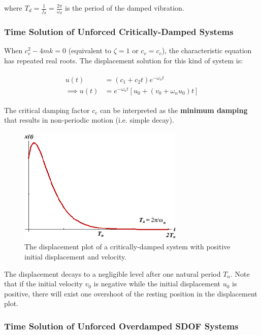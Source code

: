 \documentclass[10pt,b5paper,titlepage]{book}
\newenvironment{eqarray}
{
    \begin{eqnarray}
        \begin{aligned}
}
{
        \end{aligned}
    \end{eqnarray}
}
\begin{document}
where $ T_d = \frac{1}{f_d} = \frac{2 \pi}{\omega_d} $ is the period of the
damped vibration.


\subsubsection{Time Solution of Unforced Critically-Damped Systems}

When $ c_v^2 - 4 m k = 0 $ (equivalent to $ \zeta = 1 $ or $ c_v = c_c $), the
characteristic equation has repeated real roots. The displacement solution for
this kind of system is:

\begin{eqarray}
    u(t) &= \left( c_1 + c_2 t \right) e^{-\omega_n t}\\
    \implies u(t) &= e^{-\omega_n t} \left[ u_0 + \left( v_0 + \omega_n u_0 \right) t \right]
\end{eqarray}

The critical damping factor $ c_c $ can be interpreted as the \textbf{minimum damping}
that results in non-periodic motion (i.e. simple decay).

\begin{figure}[ht]
    \centering
    \includegraphics[width=0.70\textwidth]{img/SDOF_CriticalDamped_Response.png}
    \caption{The displacement plot of a critically-damped system with positive initial
displacement and velocity.}
    \label{fig:SDOF-critically-damped-response-png}
\end{figure}

The displacement decays to a negligible level after one natural period $ T_n $.
Note that if the initial velocity $ v_0 $ is negative while the initial displacement
$ u_0 $ is positive, there will exist one overshoot of the resting position in
the displacement plot.


\subsubsection{Time Solution of Unforced Overdamped SDOF Systems}
\end{document}
